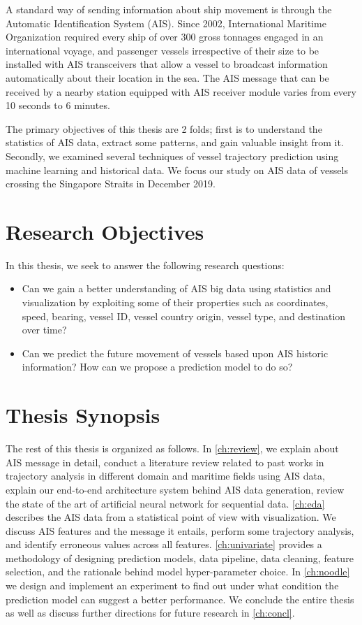 A standard way of sending information about ship movement is through the Automatic Identification System (AIS). Since 2002, International Maritime Organization required every ship of over 300 gross tonnages engaged in an international voyage, and passenger vessels irrespective of their size to be installed with AIS transceivers that allow a vessel to broadcast information automatically about their location in the sea. The AIS message that can be received by a nearby station equipped with AIS receiver module varies from every 10 seconds to 6 minutes. 

The primary objectives of this thesis are 2 folds; first is to understand the statistics of AIS data, extract some patterns, and gain valuable insight from it. Secondly, we examined several techniques of vessel trajectory prediction using machine learning and historical data. We focus our study on AIS data of vessels crossing the Singapore Straits in December 2019.

\section{Research Objectives}
In this thesis, we seek to answer the following research questions:

\begin{itemize}
    \item Can we gain a better understanding of AIS big data using statistics and visualization by exploiting some of their properties such as coordinates, speed, bearing, vessel ID, vessel country origin, vessel type, and destination over time?
    \item Can we predict the future movement of vessels based upon AIS historic information? How can we propose a prediction model to do so?
\end{itemize}

\section{Thesis Synopsis}

The rest of this thesis is organized as follows. 
In \autoref{ch:review}, we explain about AIS message in detail, conduct a literature review related to past works in trajectory analysis in different domain and maritime fields using AIS data, explain our end-to-end architecture system behind AIS data generation, review the state of the art of artificial neural network for sequential data.
\autoref{ch:eda} describes the AIS data from a statistical point of view with visualization. We discuss AIS features and the message it entails, perform some trajectory analysis, and identify erroneous values across all features.
\autoref{ch:univariate} provides a methodology of designing prediction models, data pipeline, data cleaning, feature selection, and the rationale behind model hyper-parameter choice.
In \autoref{ch:noodle} we design and implement an experiment to find out under what condition the prediction model can suggest a better performance.
We conclude the entire thesis as well as discuss further directions for future research in \autoref{ch:concl}.